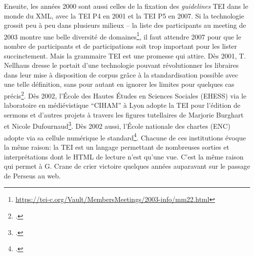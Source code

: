 Ensuite, les années 2000 sont aussi celles de la fixation des \textit{guidelines} TEI dans le monde du XML, avec la TEI P4 en 2001 et la TEI P5 en 2007. Si la technologie grossit peu à peu dans plusieurs milieux -- la liste des participants au meeting de 2003 montre une belle diversité de domaines\footnote{\url{https://tei-c.org/Vault/MembersMeetings/2003-info/mm22.html}}, il faut attendre 2007 pour que le nombre de participants et de participations soit trop important pour les lister succinctement. Mais la grammaire TEI est une promesse qui attire. Dès 2001, T. Nellhaus dresse le portait d'une technologie pouvant révolutionner les libraires dans leur mise à disposition de corpus grâce à la standardisation possible avec une telle définition, sans pour autant en ignorer les limites pour quelques cas précis\footcite{nellhaus_xml_2001}. Dès 2002, l'École des Hautes Études en Sciences Sociales (EHESS) via le laboratoire en médiévistique  ``CIHAM'' à Lyon adopte la TEI pour l'édition de sermons et d'autres projets à travers les figures tutellaires de Marjorie Burghart et Nicole Dufournaud\footcite{burghart_edition_2011}. Dès 2002 aussi, l'École nationale des chartes (ENC) adopte via sa cellule numérique le standard\footcite{poupeau_les_2006}. Chacune de ces institutions évoque la même raison: la TEI est un langage permettant de nombreuses sorties et interprétations dont le HTML de lecture n'est qu'une vue. C'est la même raison qui permet à G. Crane de crier victoire quelques années auparavant sur le passage de Perseus au web.

